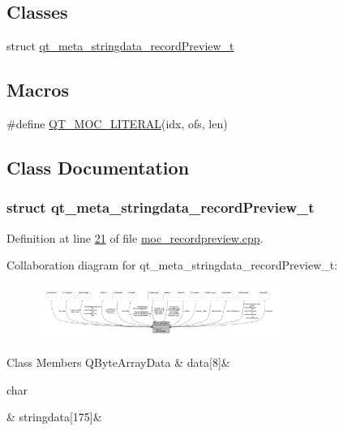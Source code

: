 \subsection*{Classes}
\begin{DoxyCompactItemize}
\item 
struct \hyperlink{a00068_dd/dc1/a00212}{qt\+\_\+meta\+\_\+stringdata\+\_\+record\+Preview\+\_\+t}
\end{DoxyCompactItemize}
\subsection*{Macros}
\begin{DoxyCompactItemize}
\item 
\#define \hyperlink{a00068_a75bb9482d242cde0a06c9dbdc6b83abe}{Q\+T\+\_\+\+M\+O\+C\+\_\+\+L\+I\+T\+E\+R\+A\+L}(idx, ofs, len)
\end{DoxyCompactItemize}


\subsection{Class Documentation}
\label{dd/dc1/a00212}
\hypertarget{a00068_dd/dc1/a00212}{}
\subsubsection{struct qt\+\_\+meta\+\_\+stringdata\+\_\+record\+Preview\+\_\+t}


Definition at line \hyperlink{a00068_source_l00021}{21} of file \hyperlink{a00068_source}{moc\+\_\+recordpreview.\+cpp}.



Collaboration diagram for qt\+\_\+meta\+\_\+stringdata\+\_\+record\+Preview\+\_\+t\+:
\nopagebreak
\begin{figure}[H]
\begin{center}
\leavevmode
\includegraphics[width=222pt]{d7/df2/a00312}
\end{center}
\end{figure}
\begin{DoxyFields}{Class Members}
\hypertarget{a00068_a61be725f4f67b385a56830793423ff45}{Q\+Byte\+Array\+Data}\label{a00068_a61be725f4f67b385a56830793423ff45}
&
data\mbox{[}8\mbox{]}&
\\
\hline

\hypertarget{a00068_af0762b30c491f46fa9caf80c9ae5f6ca}{char}\label{a00068_af0762b30c491f46fa9caf80c9ae5f6ca}
&
stringdata\mbox{[}175\mbox{]}&
\\
\hline

\end{DoxyFields}


